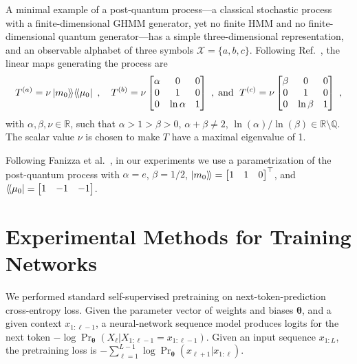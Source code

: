 \documentclass[prx,nofootinbib,onecolumn,showkeys,groupaddress,preprintnumbers,floatfix,
superscriptaddress]{revtex4-1}
\newcommand{\dbra}[1]{\bra{ \! \langle #1}}
\newcommand{\dket}[1]{\ket{ #1 \rangle \!}}
\newcommand{\params}{\boldsymbol{\theta}}
\begin{document}
A minimal example of a post-quantum process---a classical stochastic process with a finite-dimensional GHMM generator, yet no finite HMM and no finite-dimensional quantum generator---has a simple three-dimensional representation, and an observable alphabet of three symbols $\mathcal{X} = \{ a, b, c \}$.
Following Ref.~\cite{Fanizza24_Quantum},
the linear maps generating the process are
\begin{align}
T^{(a)} = \nu \dket{m_0} \! \dbra{\mu_0} ~, \quad 
T^{(b)} = 
\nu
\begin{bmatrix}
\alpha &0&0 \\
0&1&0 \\
0& \ln \alpha & 1 
\end{bmatrix}
~, \; \text{and } \;
T^{(c)} = 
\nu
\begin{bmatrix}
\beta &0&0 \\
0 &1&0 \\
0& \ln \beta & 1 
\end{bmatrix} ~,
\end{align}
with $\alpha, \beta, \nu \in \mathbb{R}$,
such that $\alpha > 1 > \beta > 0$,
$\alpha+\beta \neq 2$,
$\ln(\alpha) / \ln(\beta) \in \mathbb{R} \setminus \mathbb{Q}$.
The scalar value
$\nu$ is chosen to make $T$ have a maximal eigenvalue of 1.

Following
Fanizza et al.~\cite{Fanizza24_Quantum}, in our experiments we use a parametrization of the post-quantum process with
$\alpha=e$, 
$\beta=1/2$,
$\dket{m_0} = \begin{bmatrix} 1 & 1 & 0\end{bmatrix}^\top$,
and 
$\dbra{\mu_0} = \begin{bmatrix} 1 & -1 & -1 \end{bmatrix}$.


\section{Experimental Methods for Training Networks}
\label{app:training-methods}

We performed standard self-supervised pretraining on next-token-prediction cross-entropy loss. Given the parameter vector of
weights and biases $\params$, and a given context $x_{1:\ell-1}$, a neural-network sequence model produces logits for the next token
$-\log \Pr_{\params}(X_\ell | X_{1:\ell-1} = x_{1:\ell-1})$.
Given an input sequence $x_{1:L}$, the pretraining loss is
$-\sum_{\ell=1}^{L-1} \log \Pr_{\params}(x_{\ell+1} |  x_{1:\ell})$.
\end{document}
